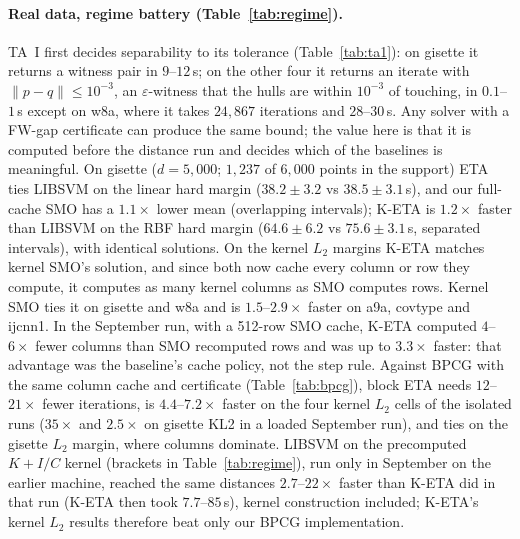 \documentclass[pdflatex,sn-apa]{sn-jnl}%
\theoremstyle{thmstyleone}
\theoremstyle{thmstyletwo}
\newcommand{\norm}[1]{\lVert #1 \rVert}
\begin{document}
\paragraph{Real data, regime battery (Table~\ref{tab:regime}).}
TA~I first decides separability to its tolerance
(Table~\ref{tab:ta1}): on gisette it returns a witness pair in
$9$--$12$\,s; on the other four it returns an iterate with
$\norm{p-q}\le10^{-3}$, an $\varepsilon$-witness that the hulls are
within $10^{-3}$ of touching, in $0.1$--$1$\,s except on w8a, where it
takes $24{,}867$ iterations and $28$--$30$\,s. Any solver with a FW-gap
certificate can produce the same bound; the value here is that it is
computed before the distance run and decides which of the baselines is
meaningful. On gisette ($d{=}5{,}000$; $1{,}237$ of $6{,}000$ points in
the support) ETA ties LIBSVM on the linear hard margin ($38.2\pm3.2$ vs
$38.5\pm3.1$\,s), and our full-cache SMO has a $1.1\times$ lower
mean (overlapping intervals); K-ETA is $1.2\times$ faster than LIBSVM on the RBF hard margin
($64.6\pm6.2$ vs $75.6\pm3.1$\,s, separated intervals), with identical
solutions. On the kernel $L_2$ margins K-ETA matches kernel SMO's
solution, and since both now cache every column or row they compute,
it computes as many kernel columns as SMO computes rows. Kernel SMO
ties it on gisette and w8a and is $1.5$--$2.9\times$ faster on a9a,
covtype and ijcnn1. In the September run, with a 512-row SMO cache,
K-ETA computed $4$--$6\times$ fewer columns than SMO recomputed rows and
was up to $3.3\times$ faster: that advantage was the baseline's cache
policy, not the step rule. Against BPCG \citep{tsuji2022} with the same
column cache and certificate (Table~\ref{tab:bpcg}), block ETA needs
$12$--$21\times$ fewer iterations, is $4.4$--$7.2\times$ faster on the
four kernel $L_2$ cells of the isolated runs ($35\times$ and $2.5\times$
on gisette KL2 in a loaded September run), and ties on the gisette
$L_2$ margin, where columns dominate. LIBSVM on the precomputed $K+I/C$
kernel (brackets in Table~\ref{tab:regime}), run only in September on
the earlier machine, reached the same distances $2.7$--$22\times$ faster
than K-ETA did in that run (K-ETA then took $7.7$--$85$\,s), kernel
construction included; K-ETA's kernel
$L_2$ results therefore beat only our BPCG implementation.
\end{document}
